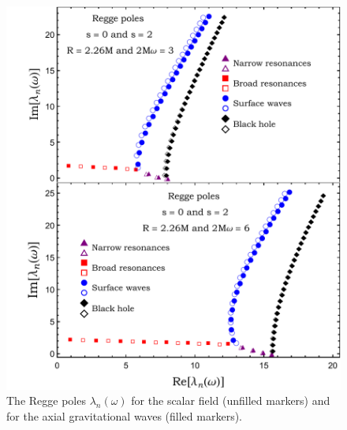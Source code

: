 \documentclass[aps,prd,longbibliography,reprint,twocolumn,amsmath,amssymb,amsfonts,showpacs,footnote,superscriptaddress]{revtex4-1}%
\begin{document}
 \begin{figure}[htb]
\centering
 \includegraphics[scale=0.50]{RP_R_2_dot_26_2Mw_3_6_s_0_s_2}
\caption{\label{RP_R226_approx_2Mw_3_6_s_1}  The Regge poles $\lambda_n(\omega)$ for the scalar field (unfilled markers) and for the axial gravitational waves (filled markers). %
}
\label{fig:rp2}
\end{figure}
\end{document}
